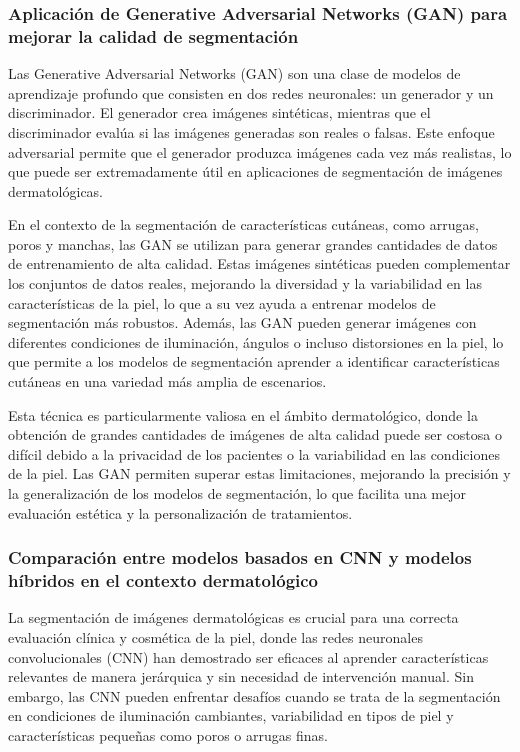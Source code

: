 %
\subsubsection{Aplicación de Generative Adversarial Networks (GAN) para mejorar la calidad de segmentación}
Las Generative Adversarial Networks (GAN) son una clase de modelos de aprendizaje profundo que consisten en dos redes neuronales: un generador y un discriminador. El generador crea imágenes sintéticas, mientras que el discriminador evalúa si las imágenes generadas son reales o falsas. Este enfoque adversarial permite que el generador produzca imágenes cada vez más realistas, lo que puede ser extremadamente útil en aplicaciones de segmentación de imágenes dermatológicas.

En el contexto de la segmentación de características cutáneas, como arrugas, poros y manchas, las GAN se utilizan para generar grandes cantidades de datos de entrenamiento de alta calidad. Estas imágenes sintéticas pueden complementar los conjuntos de datos reales, mejorando la diversidad y la variabilidad en las características de la piel, lo que a su vez ayuda a entrenar modelos de segmentación más robustos. Además, las GAN pueden generar imágenes con diferentes condiciones de iluminación, ángulos o incluso distorsiones en la piel, lo que permite a los modelos de segmentación aprender a identificar características cutáneas en una variedad más amplia de escenarios.

Esta técnica es particularmente valiosa en el ámbito dermatológico, donde la obtención de grandes cantidades de imágenes de alta calidad puede ser costosa o difícil debido a la privacidad de los pacientes o la variabilidad en las condiciones de la piel. Las GAN permiten superar estas limitaciones, mejorando la precisión y la generalización de los modelos de segmentación, lo que facilita una mejor evaluación estética y la personalización de tratamientos.

\cite{goodfellow2014}
%
\subsubsection{Comparación entre modelos basados en CNN y modelos híbridos en el contexto dermatológico}
La segmentación de imágenes dermatológicas es crucial para una correcta evaluación clínica y cosmética de la piel, donde las redes neuronales convolucionales (CNN) han demostrado ser eficaces al aprender características relevantes de manera jerárquica y sin necesidad de intervención manual. Sin embargo, las CNN pueden enfrentar desafíos cuando se trata de la segmentación en condiciones de iluminación cambiantes, variabilidad en tipos de piel y características pequeñas como poros o arrugas finas.

